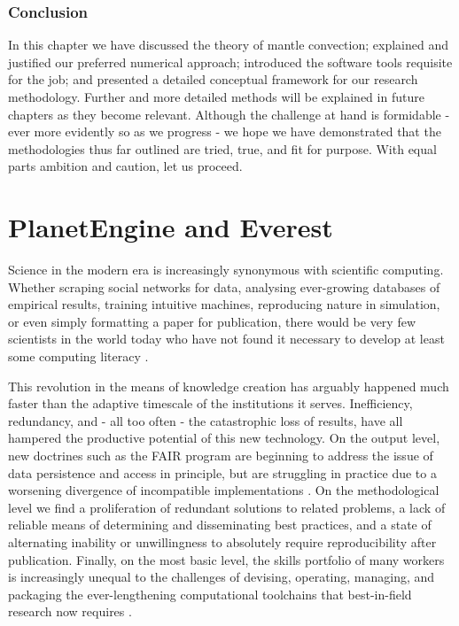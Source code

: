 \documentclass[a4paper,11pt,oneside]{book}
\renewcommand{\section}[1]{\chapter{#1}}
\begin{document}
\subsection{Conclusion}

In this chapter we have discussed the theory of mantle convection; explained and justified our preferred numerical approach; introduced the software tools requisite for the job; and presented a detailed conceptual framework for our research methodology. Further and more detailed methods will be explained in future chapters as they become relevant. Although the challenge at hand is formidable - ever more evidently so as we progress - we hope we have demonstrated that the methodologies thus far outlined are tried, true, and fit for purpose. With equal parts ambition and caution, let us proceed.

\section{PlanetEngine and Everest}

Science in the modern era is increasingly synonymous with scientific computing. Whether scraping social networks for data, analysing ever-growing databases of empirical results, training intuitive machines, reproducing nature in simulation, or even simply formatting a paper for publication, there would be very few scientists in the world today who have not found it necessary to develop at least some computing literacy \cite{Wilson2014-zo}.

This revolution in the means of knowledge creation has arguably happened much faster than the adaptive timescale of the institutions it serves. Inefficiency, redundancy, and - all too often - the catastrophic loss of results, have all hampered the productive potential of this new technology. On the output level, new doctrines such as the FAIR program \cite{Wilkinson2016-qr} are beginning to address the issue of data persistence and access in principle, but are struggling in practice due to a worsening divergence of incompatible implementations \cite{Jacobsen2020-cc}. On the methodological level we find a proliferation of redundant solutions to related problems, a lack of reliable means of determining and disseminating best practices, and a state of alternating inability or unwillingness to absolutely require reproducibility after publication. Finally, on the most basic level, the skills portfolio of many workers is increasingly unequal to the challenges of devising, operating, managing, and packaging the ever-lengthening computational toolchains that best-in-field research now requires \cite{Wilson2017-xm}.
\end{document}
